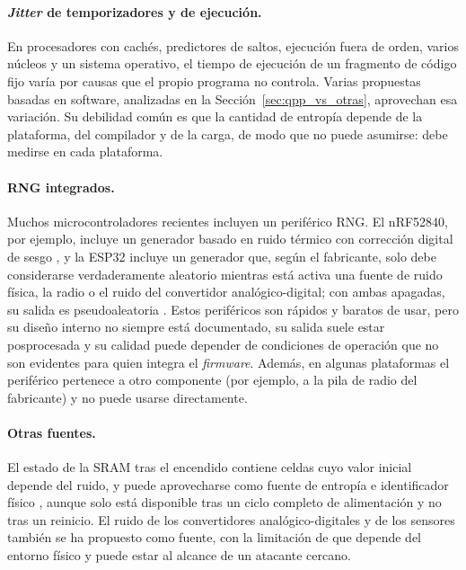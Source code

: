 \paragraph{\textit{Jitter} de temporizadores y de ejecución.} En procesadores con cachés, predictores de saltos, ejecución fuera de orden, varios núcleos y un sistema operativo, el tiempo de ejecución de un fragmento de código fijo varía por causas que el propio programa no controla. Varias propuestas basadas en software, analizadas en la Sección~\ref{sec:qpp_vs_otras}, aprovechan esa variación. Su debilidad común es que la cantidad de entropía depende de la plataforma, del compilador y de la carga, de modo que no puede asumirse: debe medirse en cada plataforma.

\paragraph{RNG integrados.} Muchos microcontroladores recientes incluyen un periférico RNG. El nRF52840, por ejemplo, incluye un generador basado en ruido térmico con corrección digital de sesgo \cite{NordicNRF52840PS}, y la ESP32 incluye un generador que, según el fabricante, solo debe considerarse verdaderamente aleatorio mientras está activa una fuente de ruido física, la radio o el ruido del convertidor analógico-digital; con ambas apagadas, su salida es pseudoaleatoria \cite{EspressifRNG}. Estos periféricos son rápidos y baratos de usar, pero su diseño interno no siempre está documentado, su salida suele estar posprocesada y su calidad puede depender de condiciones de operación que no son evidentes para quien integra el \textit{firmware}. Además, en algunas plataformas el periférico pertenece a otro componente (por ejemplo, a la pila de radio del fabricante) y no puede usarse directamente.

\paragraph{Otras fuentes.} El estado de la SRAM tras el encendido contiene celdas cuyo valor inicial depende del ruido, y puede aprovecharse como fuente de entropía e identificador físico \cite{Holcomb2009SRAM}, aunque solo está disponible tras un ciclo completo de alimentación y no tras un reinicio. El ruido de los convertidores analógico-digitales y de los sensores también se ha propuesto como fuente, con la limitación de que depende del entorno físico y puede estar al alcance de un atacante cercano.


